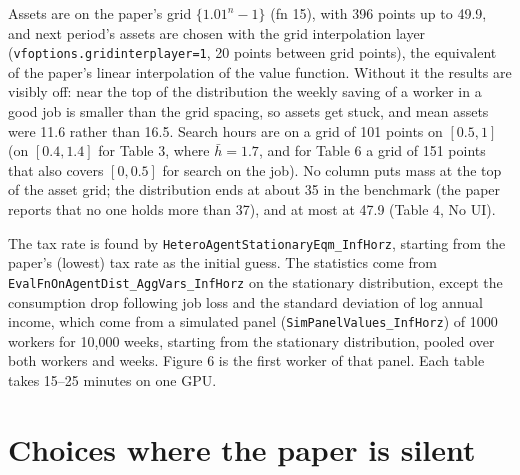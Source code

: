 \documentclass[11pt,fleqn]{article}
\begin{document}
Assets are on the paper's grid $\{1.01^n-1\}$ (fn 15), with 396 points up to 49.9, and next period's assets are chosen with the grid interpolation layer (\verb|vfoptions.gridinterplayer=1|, 20 points between grid points), the equivalent of the paper's linear interpolation of the value function. Without it the results are visibly off: near the top of the distribution the weekly saving of a worker in a good job is smaller than the grid spacing, so assets get stuck, and mean assets were 11.6 rather than 16.5. Search hours are on a grid of 101 points on $[0.5,1]$ (on $[0.4,1.4]$ for Table 3, where $\bar{h}=1.7$, and for Table 6 a grid of 151 points that also covers $[0,0.5]$ for search on the job). No column puts mass at the top of the asset grid; the distribution ends at about 35 in the benchmark (the paper reports that no one holds more than 37), and at most at 47.9 (Table 4, No UI).

The tax rate is found by \verb|HeteroAgentStationaryEqm_InfHorz|, starting from the paper's (lowest) tax rate as the initial guess. The statistics come from \verb|EvalFnOnAgentDist_AggVars_InfHorz| on the stationary distribution, except the consumption drop following job loss and the standard deviation of log annual income, which come from a simulated panel (\verb|SimPanelValues_InfHorz|) of 1000 workers for 10,000 weeks, starting from the stationary distribution, pooled over both workers and weeks. Figure 6 is the first worker of that panel. Each table takes 15--25 minutes on one GPU.


\section{Choices where the paper is silent}
\label{sec:choices}
\end{document}
